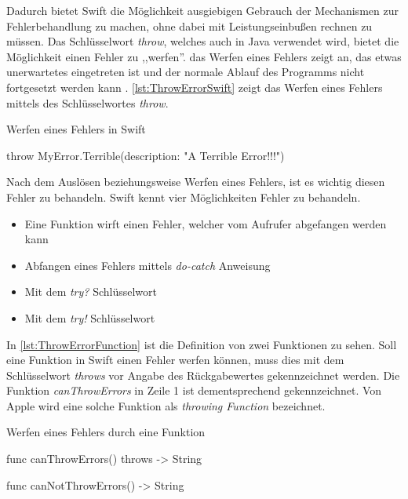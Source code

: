 Dadurch bietet Swift die Möglichkeit ausgiebigen Gebrauch der Mechanismen zur Fehlerbehandlung zu machen, ohne dabei mit Leistungseinbußen rechnen zu müssen.
Das Schlüsselwort \textit{throw}, welches auch in Java verwendet wird, bietet die Möglichkeit einen Fehler zu ,,werfen''.
das Werfen eines Fehlers zeigt an, das etwas unerwartetes eingetreten ist und der normale Ablauf des Programms nicht fortgesetzt werden kann \cite[S.311]{Apple.2017}.
\autoref{lst:ThrowErrorSwift} zeigt das Werfen eines Fehlers mittels des Schlüsselwortes \textit{throw}.

\begin{listing}
\caption{Werfen eines Fehlers in Swift}
\label{lst:ThrowErrorSwift}
\begin{SwiftCode}
throw MyError.Terrible(description: "A Terrible Error!!!")
\end{SwiftCode}
\end{listing}

Nach dem Auslösen beziehungsweise Werfen eines Fehlers, ist es wichtig diesen Fehler zu behandeln. 
Swift kennt vier Möglichkeiten Fehler zu behandeln.

\begin{itemize}
    \item Eine Funktion wirft einen Fehler, welcher vom Aufrufer abgefangen werden kann
    \item Abfangen eines Fehlers mittels \textit{do-catch} Anweisung
    \item Mit dem \textit{try?} Schlüsselwort
    \item Mit dem \textit{try!} Schlüsselwort
\end{itemize}

In \autoref{lst:ThrowErrorFunction} ist die Definition von zwei Funktionen zu sehen. 
Soll eine Funktion in Swift einen Fehler werfen können, muss dies mit dem Schlüsselwort \textit{throws} vor Angabe des Rückgabewertes gekennzeichnet werden.
Die Funktion \textit{canThrowErrors} in Zeile 1 ist dementsprechend gekennzeichnet.
Von Apple wird eine solche Funktion als \textit{throwing Function} bezeichnet. 

\begin{listing}
\caption{Werfen eines Fehlers durch eine Funktion \cite[S311]{Apple.2017}}
\label{lst:ThrowErrorFunction}
\begin{SwiftCode}
func canThrowErrors() throws -> String

func canNotThrowErrors() -> String
\end{SwiftCode}
\end{listing}

